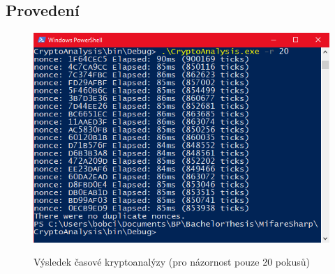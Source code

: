 \subsection{Provedení}
\begin{figure}[ht]\centering
  \centering
  \includegraphics[width=\linewidth]{obrazky-figures/obrazekKryptoanalyza.png}\\[1pt]  
  \caption{Výsledek časové kryptoanalýzy (pro názornost pouze 20 pokusů)}    
  \label{obrazekKryptoanalyza}
\end{figure}

